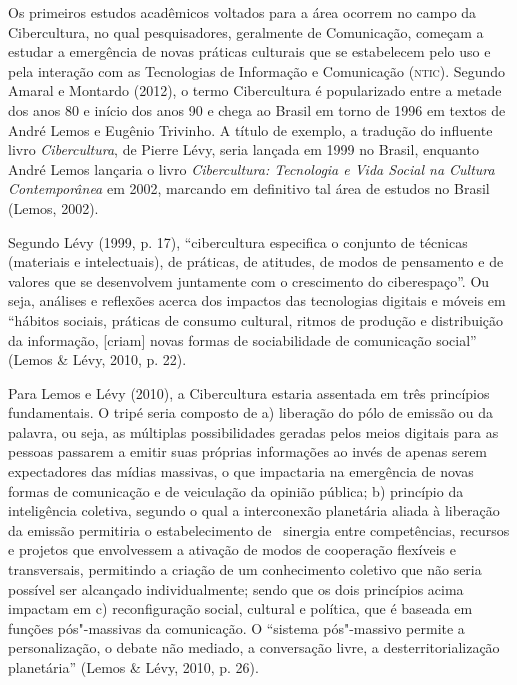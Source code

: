 Os primeiros estudos acadêmicos voltados para a área ocorrem no campo da
Cibercultura, no qual pesquisadores, geralmente de Comunicação,
começam a estudar a emergência de novas práticas culturais que se
estabelecem pelo uso e pela interação com as Tecnologias de Informação e
Comunicação (\textsc{ntic}). Segundo Amaral e Montardo (2012), o termo
Cibercultura é popularizado entre a metade dos anos 80 e início dos anos
90 e chega ao Brasil em torno de 1996 em textos de André Lemos e Eugênio
Trivinho. A título de exemplo, a tradução do influente livro
\emph{Cibercultura}, de Pierre Lévy, seria lançada em 1999 no Brasil,
enquanto André Lemos lançaria o livro \emph{Cibercultura: Tecnologia e
Vida Social na Cultura Contemporânea} em 2002, marcando em definitivo
tal área de estudos no Brasil (Lemos, 2002).

Segundo Lévy (1999, p. 17), ``cibercultura especifica o conjunto de
técnicas (materiais e intelectuais), de práticas, de atitudes, de modos
de pensamento e de valores que se desenvolvem juntamente com o
crescimento do ciberespaço''. Ou seja, análises e reflexões acerca dos
impactos das tecnologias digitais e móveis em ``hábitos sociais,
práticas de consumo cultural, ritmos de produção e distribuição da
informação, {[}criam{]} novas formas de sociabilidade de comunicação
social'' (Lemos \& Lévy, 2010, p. 22).

Para Lemos e Lévy (2010), a Cibercultura estaria assentada em três
princípios fundamentais. O tripé seria composto de a) liberação do pólo
de emissão ou da palavra, ou seja, as múltiplas possibilidades geradas
pelos meios digitais para as pessoas passarem a emitir suas próprias
informações ao invés de apenas serem expectadores das mídias massivas, o
que impactaria na emergência de novas formas de comunicação e de
veiculação da opinião pública; b) princípio da inteligência coletiva,
segundo o qual a interconexão planetária aliada à liberação da emissão
permitiria o estabelecimento de ~sinergia entre competências, recursos e
projetos que envolvessem a ativação de modos de cooperação flexíveis e
transversais, permitindo a criação de um conhecimento coletivo que não
seria possível ser alcançado individualmente; sendo que os dois
princípios acima impactam em c) reconfiguração social, cultural e
política, que é baseada em funções pós"-massivas da comunicação. O
``sistema pós"-massivo permite a personalização, o debate não mediado, a
conversação livre, a desterritorialização planetária'' (Lemos \& Lévy,
2010, p. 26).

